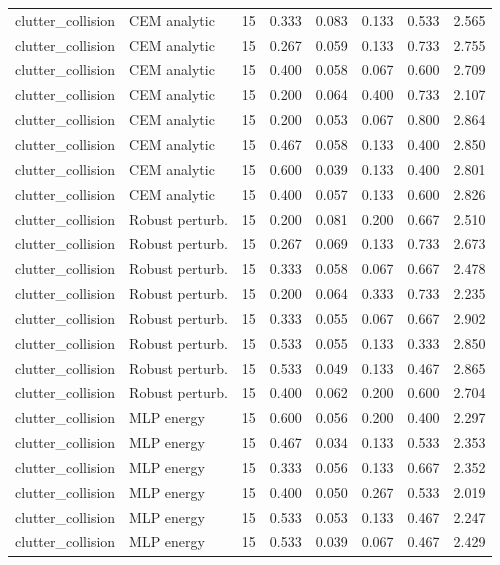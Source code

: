 {\begin{longtable}{llrrrrrr}
clutter\_collision & CEM analytic & 15 & 0.333 & 0.083 & 0.133 & 0.533 & 2.565 \\
clutter\_collision & CEM analytic & 15 & 0.267 & 0.059 & 0.133 & 0.733 & 2.755 \\
clutter\_collision & CEM analytic & 15 & 0.400 & 0.058 & 0.067 & 0.600 & 2.709 \\
clutter\_collision & CEM analytic & 15 & 0.200 & 0.064 & 0.400 & 0.733 & 2.107 \\
clutter\_collision & CEM analytic & 15 & 0.200 & 0.053 & 0.067 & 0.800 & 2.864 \\
clutter\_collision & CEM analytic & 15 & 0.467 & 0.058 & 0.133 & 0.400 & 2.850 \\
clutter\_collision & CEM analytic & 15 & 0.600 & 0.039 & 0.133 & 0.400 & 2.801 \\
clutter\_collision & CEM analytic & 15 & 0.400 & 0.057 & 0.133 & 0.600 & 2.826 \\
clutter\_collision & Robust perturb. & 15 & 0.200 & 0.081 & 0.200 & 0.667 & 2.510 \\
clutter\_collision & Robust perturb. & 15 & 0.267 & 0.069 & 0.133 & 0.733 & 2.673 \\
clutter\_collision & Robust perturb. & 15 & 0.333 & 0.058 & 0.067 & 0.667 & 2.478 \\
clutter\_collision & Robust perturb. & 15 & 0.200 & 0.064 & 0.333 & 0.733 & 2.235 \\
clutter\_collision & Robust perturb. & 15 & 0.333 & 0.055 & 0.067 & 0.667 & 2.902 \\
clutter\_collision & Robust perturb. & 15 & 0.533 & 0.055 & 0.133 & 0.333 & 2.850 \\
clutter\_collision & Robust perturb. & 15 & 0.533 & 0.049 & 0.133 & 0.467 & 2.865 \\
clutter\_collision & Robust perturb. & 15 & 0.400 & 0.062 & 0.200 & 0.600 & 2.704 \\
clutter\_collision & MLP energy & 15 & 0.600 & 0.056 & 0.200 & 0.400 & 2.297 \\
clutter\_collision & MLP energy & 15 & 0.467 & 0.034 & 0.133 & 0.533 & 2.353 \\
clutter\_collision & MLP energy & 15 & 0.333 & 0.056 & 0.133 & 0.667 & 2.352 \\
clutter\_collision & MLP energy & 15 & 0.400 & 0.050 & 0.267 & 0.533 & 2.019 \\
clutter\_collision & MLP energy & 15 & 0.533 & 0.053 & 0.133 & 0.467 & 2.247 \\
clutter\_collision & MLP energy & 15 & 0.533 & 0.039 & 0.067 & 0.467 & 2.429 \\

\end{longtable}}
